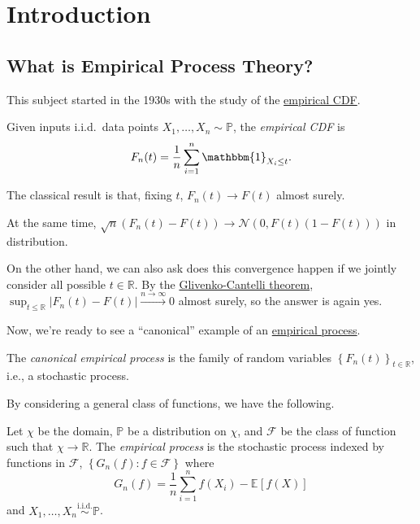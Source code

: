 \chapter{Introduction}
\section{What is Empirical Process Theory?}
This subject started in the 1930s with the study of the \hyperref[def:empirical-CDF]{empirical CDF}.

\begin{definition}\label{def:empirical-CDF}
	Given inputs i.i.d.\ data points \(X_1, \dots , X_n \sim \mathbb{P} \), the \emph{empirical CDF} is
	\[
		F_n(t) = \frac{1}{n} \sum_{i=1}^{n} \mathbbm{1}_{X_i \leq t} .
	\]
\end{definition}

The classical result is that, fixing \(t\), \(F_n(t) \to F(t)\) almost surely.

\begin{note}
	At the same time, \(\sqrt{n} (F_n(t) - F(t)) \to \mathcal{N} (0, F(t)(1 - F(t)))\) in distribution.
\end{note}

On the other hand, we can also ask does this convergence happen if we jointly consider all possible \(t\in \mathbb{R} \). By the \href{https://en.wikipedia.org/wiki/Glivenko-Cantelli_theorem}{Glivenko-Cantelli theorem}, \(\sup _{t \leq\mathbb{R} } \vert F_n(t) - F(t) \vert \overset{n \to \infty }{\to } 0\) almost surely, so the answer is again yes.

Now, we're ready to see a ``canonical'' example of an \hyperref[def:EP]{empirical process}.

\begin{eg}
	The \emph{canonical empirical process} is the family of random variables \(\left\{ F_n(t) \right\}_{t\in \mathbb{R} } \), i.e., a stochastic process.
\end{eg}

By considering a general class of functions, we have the following.

\begin{definition}\label{def:EP}
	Let \(\chi \) be the domain, \(\mathbb{P} \) be a distribution on \(\chi \), and \(\mathscr{F} \) be the class of function such that \(\chi \to \mathbb{R} \). The \emph{empirical process} is the stochastic process indexed by functions in \(\mathscr{F} \), \(\left\{ G_n(f) \colon f\in \mathscr{F}  \right\} \) where
	\[
		G_n(f) = \frac{1}{n} \sum_{i=1}^{n} f(X_i) - \mathbb{E}_{}\left[f(X) \right]
	\]
	and \(X_1, \dots , X_n \overset{\text{i.i.d.} }{\sim } \mathbb{P} \).
\end{definition}

